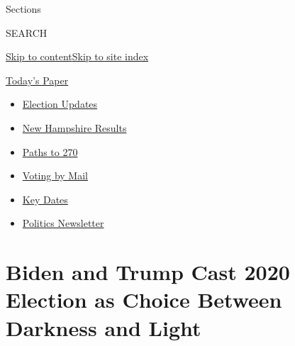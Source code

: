 Sections

SEARCH

\protect\hyperlink{site-content}{Skip to
content}\protect\hyperlink{site-index}{Skip to site index}

\href{https://myaccount.nytimes3xbfgragh.onion/auth/login?response_type=cookie\&client_id=vi}{}

\href{https://www.nytimes3xbfgragh.onion/section/todayspaper}{Today's
Paper}

\begin{itemize}
\item
  \href{https://www.nytimes3xbfgragh.onion/live/2020/09/09/us/trump-vs-biden?action=click\&pgtype=Article\&state=default\&region=TOP_BANNER\&context=storylines_menu}{Election
  Updates}
\item
  \href{https://www.nytimes3xbfgragh.onion/interactive/2020/09/08/us/elections/results-new-hampshire-primary-elections.html?action=click\&pgtype=Article\&state=default\&region=TOP_BANNER\&context=storylines_menu}{New
  Hampshire Results}
\item
  \href{https://www.nytimes3xbfgragh.onion/interactive/2020/us/elections/election-states-biden-trump.html?action=click\&pgtype=Article\&state=default\&region=TOP_BANNER\&context=storylines_menu}{Paths
  to 270}
\item
  \href{https://www.nytimes3xbfgragh.onion/interactive/2020/08/31/us/politics/vote-by-mail-deadlines.html?action=click\&pgtype=Article\&state=default\&region=TOP_BANNER\&context=storylines_menu}{Voting
  by Mail}
\item
  \href{https://www.nytimes3xbfgragh.onion/interactive/2019/us/elections/2020-presidential-election-calendar.html?action=click\&pgtype=Article\&state=default\&region=TOP_BANNER\&context=storylines_menu}{Key
  Dates}
\item
  \href{https://www.nytimes3xbfgragh.onion/newsletters/politics?action=click\&pgtype=Article\&state=default\&region=TOP_BANNER\&context=storylines_menu}{Politics
  Newsletter}
\end{itemize}

\hypertarget{biden-and-trump-cast-2020-election-as-choice-between-darkness-and-light}{%
\section{Biden and Trump Cast 2020 Election as Choice Between Darkness
and
Light}\label{biden-and-trump-cast-2020-election-as-choice-between-darkness-and-light}}

